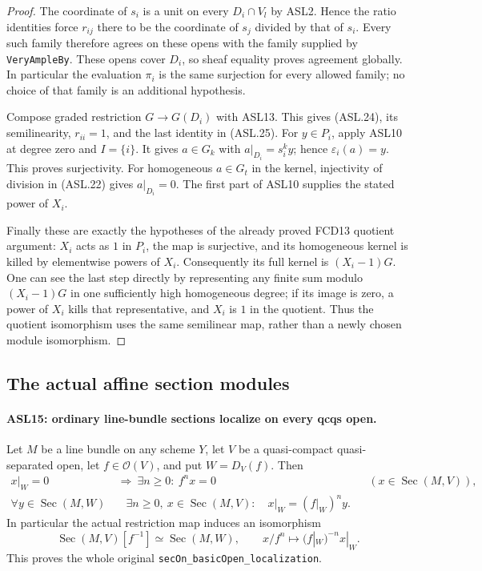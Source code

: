 \documentclass[11pt,a4paper]{article}
\numberwithin{equation}{section}
\theoremstyle{remark}\newtheorem{remark}[theorem]{Remark}
\begin{document}
\begin{proof}
The coordinate of $s_i$ is a unit on every $D_i\cap V_l$ by
ASL2.  Hence the ratio identities force $r_{ij}$ there to be
the coordinate of $s_j$ divided by that of $s_i$.  Every such
family therefore agrees on these opens with the family supplied
by \texttt{Very\allowbreak{}Ample\allowbreak{}By}.  These opens cover $D_i$,
so sheaf equality proves agreement globally.  In particular the
evaluation $\pi_i$ is the same surjection for every allowed family;
no choice of that family is an additional hypothesis.

Compose graded restriction $G\to G(D_i)$ with ASL13.
This gives (ASL.24), its semilinearity, $r_{ii}=1$, and the
last identity in (ASL.25).
For $y\in P_i$, apply ASL10 at degree zero and $I=\{i\}$.
It gives $a\in G_k$ with $a|_{D_i}=s_i^ky$; hence
$\varepsilon_i(a)=y$.  This proves surjectivity.
For homogeneous $a\in G_t$ in the kernel, injectivity of
division in (ASL.22) gives $a|_{D_i}=0$.  The first part of
ASL10 supplies the stated power of $X_i$.

Finally these are exactly the hypotheses of the already proved
FCD13 quotient argument: $X_i$ acts as $1$ in $P_i$, the map
is surjective, and its homogeneous kernel is killed by elementwise
powers of $X_i$.  Consequently its full kernel is $(X_i-1)G$.
One can see the last step directly by representing any finite sum
modulo $(X_i-1)G$ in one sufficiently high homogeneous degree;
if its image is zero, a power of $X_i$ kills that representative,
and $X_i$ is $1$ in the quotient.  Thus the quotient isomorphism
uses the same semilinear map, rather than a newly chosen module
isomorphism.
\end{proof}

\subsection{The actual affine section modules}

\paragraph{ASL15: ordinary line-bundle sections localize on every qcqs open.}
\label{claim:ASL15}
Let $M$ be a line bundle on any scheme $Y$, let $V$ be a
quasi-compact quasi-separated open, let $f\in\mathcal O(V)$,
and put $W=D_V(f)$.  Then
\[
 \begin{aligned}
 x|_W=0&\ \Longrightarrow\ \exists n\ge0:\ f^nx=0
                    &&(x\in\operatorname{Sec}(M,V)),\\
 \forall y\in\operatorname{Sec}(M,W)&\quad
 \exists n\ge0,\ x\in\operatorname{Sec}(M,V):\quad
                    x|_W=(f|_W)^ny.
 \end{aligned}                                            \tag{ASL.26}
\]
In particular the actual restriction map induces an isomorphism
\[
 \operatorname{Sec}(M,V)[f^{-1}]
                      \simeq\operatorname{Sec}(M,W),
 \qquad x/f^n\longmapsto(f|_W)^{-n}x|_W.            \tag{ASL.27}
\]
This proves the whole original \texttt{sec\allowbreak{}On\_\allowbreak{}basic\allowbreak{}Open\_\allowbreak{}localization}.
\end{document}
